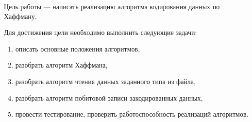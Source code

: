 Цель работы --- написать реализацию алгоритма кодирования данных по Хаффману.

Для достижения цели необходимо выполнить следующие задачи:
\begin{enumerate}
\item описать основные положения алгоритмов,
\item разобрать алгоритм Хаффмана,
\item разобрать алгоритм чтения данных заданного типа из файла,
\item разобрать алгоритм побитовой записи закодированных данных,
\item провести тестирование, проверить работоспособность реализаций алгоритмов.
\end{enumerate}
\clearpage
